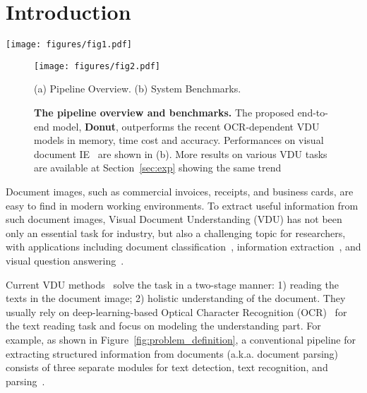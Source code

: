 \documentclass[runningheads]{llncs}
\newcommand\oursb{{\textbf{\mbox{Donut}}}\xspace}
\begin{document}
\section{Introduction}
\begin{figure*}[t]
\centering
  \texttt{[image: figures/fig1.pdf]} 
  \caption{{\bf The schema of the conventional document information extraction (IE) pipeline.} (a) The goal is to extract the structured information from a given semi-structured document image. In the pipeline, (b) text detection is conducted to obtain text locations and (c) each box is passed to the recognizer to comprehend characters. (d) Finally, the recognized texts and its locations are passed to the following module to be processed for the desired structured form of the information} \label{fig:problem_definition}
\end{figure*}

\begin{figure}[t]
\begin{center}
\texttt{[image: figures/fig2.pdf]} 
\end{center}
\vspace*{-0.4cm}
\hspace*{1.4cm} {\scriptsize (a) Pipeline Overview.} \hspace*{3.0cm} {\scriptsize (b) System Benchmarks.}
\vspace*{-0.2cm}
\caption{\textbf{The pipeline overview and benchmarks.} The proposed end-to-end model, \oursb, outperforms the recent OCR-dependent VDU models in memory, time cost and accuracy. Performances on visual document IE~\cite{park2019cord} are shown in (b). More results on various VDU tasks are available at Section~\ref{sec:exp} showing the same trend} \label{fig:teaser_summary}
\end{figure}

Document images, such as commercial invoices, receipts, and business cards, are easy to find in modern working environments.
To extract useful information from such document images, Visual Document Understanding (VDU) has not been only an essential task for industry, but also a challenging topic for researchers, with applications including document classification~\cite{Kang2014ConvolutionalNN,7333933}, information extraction~\cite{hwang2019pot,majumder2020representation}, and visual question answering~\cite{mathew2021docvqa,icdar21docvqa}.

Current VDU methods~\cite{hwang2019pot,hwang2020spade,xu2019_layoutLM,xu-etal-2021-layoutlmv2,hong2021bros} solve the task in a two-stage manner: 1) reading the texts in the document image; 2) holistic understanding of the document.
They usually rely on deep-learning-based Optical Character Recognition (OCR)~\cite{baek2019craft,baek2019wrong} for the text reading task and focus on modeling the understanding part. 
For example, as shown in Figure~\ref{fig:problem_definition}, a conventional pipeline for extracting structured information from documents (a.k.a. document parsing) consists of three separate modules for text detection, text recognition, and parsing~\cite{hwang2019pot,hwang2020spade}.
\end{document}

